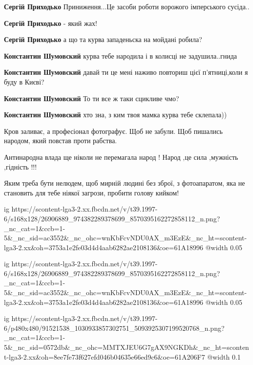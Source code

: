 \begin{itemize} %
\textbf{Сергій Приходько} Приниження...Це засоби роботи ворожого імперського сусіда..

\textbf{Сергій Приходько} - який жах!

\textbf{Сергій Приходько} а що та курва западеньска на мойдані робила?

\textbf{Константин Шумовский} курва тебе народила і в колисці не задушила..гнида

\textbf{Константин Шумовский} давай ти це мені наживо повториш цієї п'ятниці,коли я буду в Києві?

\textbf{Константин Шумовский} То ти все ж таки сцикливе чмо?

\textbf{Константин Шумовский} хто зна, з ким твоя мамка курва тебе склепала))

\end{itemize} %

Кров заливає, а професіонал фотографує. Щоб не забули. Щоб пишались народом, який повстав проти рабства.

Антинародна влада ще ніколи не перемагала народ ! Народ ,це сила ,мужність ,гідність !!!

Яким треба бути нелюдем, щоб мирній людині без зброї, з фотоапаратом, яка не
становить для тебе ніякої загрози, пробити голову кийком!


\ifcmt
  ig https://scontent-lga3-2.xx.fbcdn.net/v/t39.1997-6/s168x128/26906889_974382289378699_8570395162272858112_n.png?_nc_cat=1&ccb=1-5&_nc_sid=ac3552&_nc_ohc=wnKbFcvNDU0AX_m3EzE&_nc_ht=scontent-lga3-2.xx&oh=3753a1e2fe03d4d4aab6282ae2108136&oe=61A18996
  @width 0.05
\fi


\ifcmt
  ig https://scontent-lga3-2.xx.fbcdn.net/v/t39.1997-6/s168x128/26906889_974382289378699_8570395162272858112_n.png?_nc_cat=1&ccb=1-5&_nc_sid=ac3552&_nc_ohc=wnKbFcvNDU0AX_m3EzE&_nc_ht=scontent-lga3-2.xx&oh=3753a1e2fe03d4d4aab6282ae2108136&oe=61A18996
  @width 0.05
\fi


\ifcmt
  ig https://scontent-lga3-2.xx.fbcdn.net/v/t39.1997-6/p480x480/91521538_1030933857302751_5093925307199520768_n.png?_nc_cat=1&ccb=1-5&_nc_sid=0572db&_nc_ohc=MMTXJEU6G7gAX9NGKDh&_nc_ht=scontent-lga3-2.xx&oh=8ee7fe73f627efd046b04635e66ed9c6&oe=61A206F7
  @width 0.1
\fi

